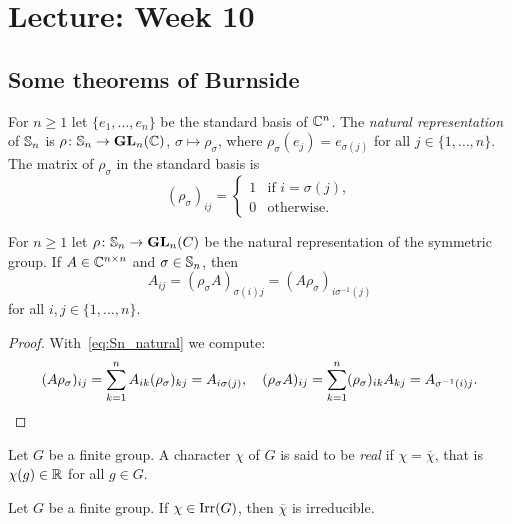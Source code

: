 \section{Lecture: Week 10}

\subsection{Some theorems of Burnside}

For $n\geq1$ let $\{e_1,\dots,e_n\}$ be the standard basis of $\mathbb{C}^n$.  
The \emph{natural representation} of $\mathbb{S}_n$ is 
$\rho\colon\mathbb{S}_n\to\mathbf{GL}_n(\mathbb{C})$, $\sigma\mapsto\rho_{\sigma}$, 
where $\rho_\sigma(e_j)=e_{\sigma(j)}$ for all $j\in\{1,\dots,n\}$. 
The matrix of $\rho_\sigma$ in the standard basis is  
\begin{equation}
    \label{eq:Sn_natural}
    (\rho_\sigma)_{ij}=\begin{cases}
      1 & \text{if $i=\sigma(j)$},\\
      0 & \text{otherwise}.
    \end{cases}
\end{equation}

\begin{lemma}
	\label{lem:permutaciones}
	For $n\geq1$ let $\rho\colon\mathbb{S}_n\to\mathbf{GL}_n(C)$ be the natural 
	representation of the symmetric group. 
	If $A\in\mathbb{C}^{n\times n}$ and $\sigma\in\mathbb{S}_n$, then
	\[
		A_{ij}=(\rho_{\sigma}A)_{\sigma(i)j}=(A\rho_{\sigma})_{i\sigma^{-1}(j)}
	\]
    for all $i,j\in\{1,\dots,n\}$.
\end{lemma}

\begin{proof}
	With~\eqref{eq:Sn_natural} we compute:
	\[
		(A\rho_{\sigma})_{ij}=\sum_{k=1}^n A_{ik}(\rho_{\sigma})_{kj}=A_{i\sigma(j)},
		\quad
		(\rho_\sigma A)_{ij}=\sum_{k=1}^n (\rho_\sigma)_{ik}A_{kj}=A_{\sigma^{-1}(i)j}.\qedhere
	\]
\end{proof}

\begin{definition}
  Let $G$ be a finite group. A character $\chi$ of $G$ is said to be
  \emph{real} if
  $\chi=\overline{\chi}$, that is $\chi(g)\in\mathbb{R}$ for all $g\in G$. 
\end{definition}

\begin{exercise}
	\label{xca:chi_irreducible}
	Let $G$ be a finite group. If $\chi\in\operatorname{Irr}(G)$, then 
	$\overline{\chi}$ is irreducible.
\end{exercise}

